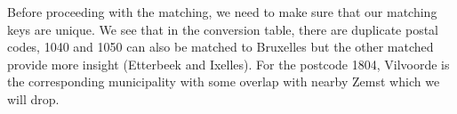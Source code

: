 \documentclass[
  english,
  11pt,
]{article}
\newenvironment{Shaded}{\begin{snugshade}}{\end{snugshade}}
\newcommand{\ControlFlowTok}[1]{\textcolor[rgb]{0.13,0.29,0.53}{\textbf{#1}}}
\newcommand{\DecValTok}[1]{\textcolor[rgb]{0.00,0.00,0.81}{#1}}
\newcommand{\FunctionTok}[1]{\textcolor[rgb]{0.13,0.29,0.53}{\textbf{#1}}}
\newcommand{\NormalTok}[1]{#1}
\newcommand{\OtherTok}[1]{\textcolor[rgb]{0.56,0.35,0.01}{#1}}
\newcommand{\SpecialCharTok}[1]{\textcolor[rgb]{0.81,0.36,0.00}{\textbf{#1}}}
\newcommand{\StringTok}[1]{\textcolor[rgb]{0.31,0.60,0.02}{#1}}
\begin{document}
Before proceeding with the matching, we need to make sure that our
matching keys are unique. We see that in the conversion table, there are
duplicate postal codes, 1040 and 1050 can also be matched to Bruxelles
but the other matched provide more insight (Etterbeek and Ixelles). For
the postcode 1804, Vilvoorde is the corresponding municipality with some
overlap with nearby Zemst which we will drop.

\begin{Shaded}
\end{Shaded}
\end{document}
